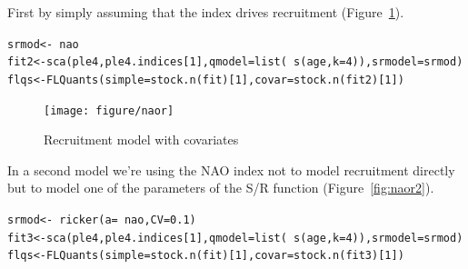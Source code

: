 \documentclass[a4paper,english,10pt]{article}\usepackage[]{graphicx}\usepackage[]{color}
\makeatletter
\newcommand{\hlnum}[1]{\textcolor[rgb]{0.2,0.2,0.2}{#1}}%
\newcommand{\hlopt}[1]{\textcolor[rgb]{0.2,0.2,0.2}{#1}}%
\newcommand{\hlstd}[1]{\textcolor[rgb]{0,0,0}{#1}}%
\newcommand{\hlkwb}[1]{\textcolor[rgb]{0.361,0.506,0.596}{#1}}%
\newcommand{\hlkwc}[1]{\textcolor[rgb]{0.361,0.506,0.596}{#1}}%
\newcommand{\hlkwd}[1]{\textcolor[rgb]{0.361,0.506,0.596}{#1}}%
\newenvironment{kframe}{%
 \def\at@end@of@kframe{}%
 \ifinner\ifhmode%
  \def\at@end@of@kframe{\end{minipage}}%
  \begin{minipage}{\columnwidth}%
 \fi\fi%
 \def\FrameCommand##1{\hskip\@totalleftmargin \hskip-\fboxsep
 \colorbox{shadecolor}{##1}\hskip-\fboxsep
     \hskip-\linewidth \hskip-\@totalleftmargin \hskip\columnwidth}%
 \MakeFramed {\advance\hsize-\width
   \@totalleftmargin\z@ \linewidth\hsize
   \@setminipage}}%
 {\par\unskip\endMakeFramed%
 \at@end@of@kframe}
\newenvironment{knitrout}{}{} %
\makeatother
\begin{document}
First by simply assuming that the index drives recruitment (Figure~\ref{fig:naor}).

\begin{knitrout}
\color{fgcolor}\begin{kframe}
\begin{alltt}
\hlstd{srmod} \hlkwb{<-} \hlopt{~} \hlstd{nao}
\hlstd{fit2} \hlkwb{<-} \hlkwd{sca}\hlstd{(ple4, ple4.indices[}\hlnum{1}\hlstd{],} \hlkwc{qmodel}\hlstd{=}\hlkwd{list}\hlstd{(}\hlopt{~}\hlkwd{s}\hlstd{(age,} \hlkwc{k}\hlstd{=}\hlnum{4}\hlstd{)),} \hlkwc{srmodel}\hlstd{=srmod)}
\hlstd{flqs} \hlkwb{<-} \hlkwd{FLQuants}\hlstd{(}\hlkwc{simple}\hlstd{=}\hlkwd{stock.n}\hlstd{(fit)[}\hlnum{1}\hlstd{],} \hlkwc{covar}\hlstd{=}\hlkwd{stock.n}\hlstd{(fit2)[}\hlnum{1}\hlstd{])}
\end{alltt}
\end{kframe}
\end{knitrout}

\begin{knitrout}
\color{fgcolor}\begin{figure}[H]


{\centering \texttt{[image: figure/naor]} 

}

\caption[Recruitment model with covariates]{Recruitment model with covariates\label{fig:naor}}
\end{figure}


\end{knitrout}

In a second model we're using the NAO index not to model recruitment directly but to model one of the parameters of the S/R function (Figure~\ref{fig:naor2}). 

\begin{knitrout}
\color{fgcolor}\begin{kframe}
\begin{alltt}
\hlstd{srmod} \hlkwb{<-} \hlopt{~} \hlkwd{ricker}\hlstd{(}\hlkwc{a}\hlstd{=}\hlopt{~}\hlstd{nao,} \hlkwc{CV}\hlstd{=}\hlnum{0.1}\hlstd{)}
\hlstd{fit3} \hlkwb{<-} \hlkwd{sca}\hlstd{(ple4, ple4.indices[}\hlnum{1}\hlstd{],} \hlkwc{qmodel}\hlstd{=}\hlkwd{list}\hlstd{(}\hlopt{~}\hlkwd{s}\hlstd{(age,} \hlkwc{k}\hlstd{=}\hlnum{4}\hlstd{)),} \hlkwc{srmodel}\hlstd{=srmod)}
\hlstd{flqs} \hlkwb{<-} \hlkwd{FLQuants}\hlstd{(}\hlkwc{simple}\hlstd{=}\hlkwd{stock.n}\hlstd{(fit)[}\hlnum{1}\hlstd{],} \hlkwc{covar}\hlstd{=}\hlkwd{stock.n}\hlstd{(fit3)[}\hlnum{1}\hlstd{])}
\end{alltt}
\end{kframe}
\end{knitrout}
\end{document}
